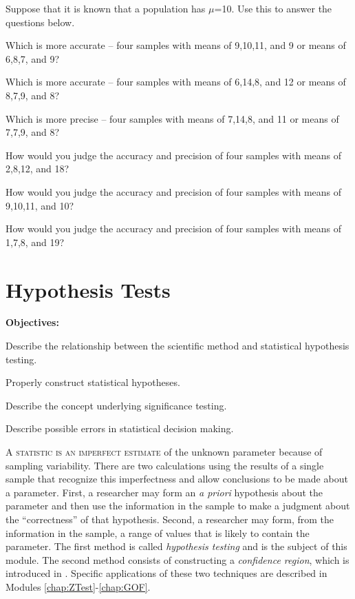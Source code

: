 \documentclass[10pt,openany]{book}\usepackage[]{graphicx}\usepackage[]{color}
\begin{document}
\begin{exsection}
  \item \label{revex:SamplingDistPA} Suppose that it is known that a population has $\mu$=10.  Use this to answer the questions below. 
  \begin{Enumerate}
    \item Which is more accurate -- four samples with means of 9,10,11, and 9 or means of 6,8,7, and 9?
    \item Which is more accurate -- four samples with means of 6,14,8, and 12 or means of 8,7,9, and 8?
    \item Which is more precise -- four samples with means of 7,14,8, and 11 or means of 7,7,9, and 8?
    \item How would you judge the accuracy and precision of four samples with means of 2,8,12, and 18?
    \item How would you judge the accuracy and precision of four samples with means of 9,10,11, and 10?
    \item How would you judge the accuracy and precision of four samples with means of 1,7,8, and 19?
  \end{Enumerate}
\end{exsection}



\chapter{Hypothesis Tests} \label{chap:HypothesisTests}
\begin{ChapObj}{\boxwidth}
  \textbf{Objectives:}
  \begin{Enumerate}
    \item Describe the relationship between the scientific method and statistical hypothesis testing.
    \item Properly construct statistical hypotheses.
    \item Describe the concept underlying significance testing.
    \item Describe possible errors in statistical decision making.
  \end{Enumerate}
\end{ChapObj}

\minitoc
\newpage

\lettrine{A}{ statistic is an imperfect estimate} of the unknown parameter because of sampling variability.  There are two calculations using the results of a single sample that recognize this imperfectness and allow conclusions to be made about a parameter.  First, a researcher may form an \emph{a priori} hypothesis about the parameter and then use the information in the sample to make a judgment about the ``correctness'' of that hypothesis.  Second, a researcher may form, from the information in the sample, a range of values that is likely to contain the parameter.  The first method is called \emph{hypothesis testing} and is the subject of this module. The second method consists of constructing a \emph{confidence region}, which is introduced in . Specific applications of these two techniques are described in Modules \ref{chap:ZTest}-\ref{chap:GOF}.
\end{document}
